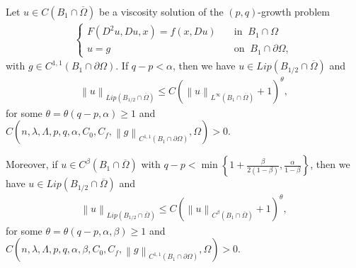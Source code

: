 \documentclass[10pt,a4paper]{amsart}
\newcommand{\norm}[1]{\left\lVert#1\right\rVert}
\begin{document}
\begin{thm} \label{Bdy1}
    Let $u \in C(B_1\cap\overline{\Omega })$ be a viscosity solution of the $(p,q)$-growth problem
    \begin{align*}
        \begin{cases}
        F(D^2u,Du,x) = f(x,Du) \quad &\text{in } \ B_1\cap \Omega \\
        u=g\quad &\text{on } \ B_1\cap \partial \Omega,
        \end{cases}
    \end{align*}  with $g\in C^{1,1}(B_1\cap\partial\Omega)$.
    If $q-p<\alpha$, then we have $u \in Lip(B_{1/2} \cap \overline{\Omega})$ and
    \begin{align*}
        \norm{u}_{Lip(B_{1/2} \cap \overline{\Omega})} \leq C(\norm{u}_{L^\infty(B_1\cap\overline{\Omega})}+1)^\theta,
    \end{align*}
    for some $\theta= \theta(q-p,\alpha)\geq1$ and $C(n,\lambda, \Lambda, p,q,\alpha,C_0, C_f,\norm{g}_{C^{1,1}(B_1\cap\partial\Omega)},\Omega)>0$.
    
    Moreover, if $u \in C^\beta(B_1\cap\overline{ \Omega})$ with $q-p<\min \left\{1 + \frac{\beta}{2(1-\beta)}, \frac{\alpha}{1-\beta} \right\}$, then we have $u \in Lip(B_{1/2} \cap \overline{\Omega})$ and
    \begin{align*}
        \norm{u}_{Lip(B_{1/2} \cap \overline{\Omega})} \leq C(\norm{u}_{C^\beta(B_1\cap\overline{\Omega})}+1)^\theta,
    \end{align*}
    for some $\theta=\theta(q-p,\alpha,\beta)\geq1$ and $C(n,\lambda, \Lambda, p,q,\alpha,\beta,C_0, C_f,\norm{g}_{C^{1,1}(B_1\cap\partial\Omega)},\Omega)>0$.
\end{thm}
\end{document}
